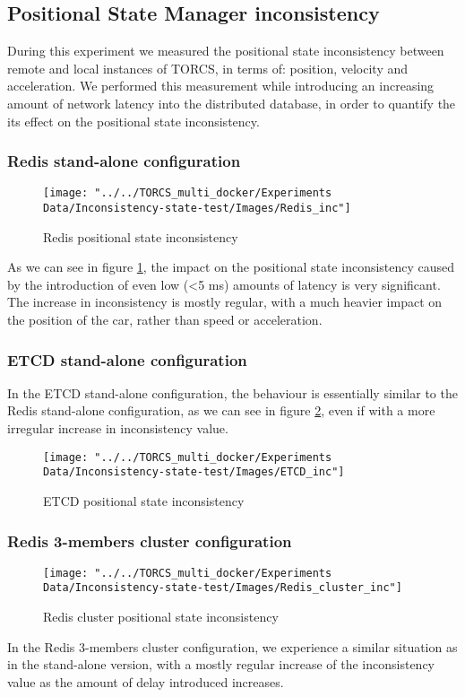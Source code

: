 \subsection{Positional State Manager inconsistency}
During this experiment we measured the positional state inconsistency between remote and local instances of TORCS, in terms of: position, velocity and acceleration. We performed this measurement while introducing an increasing amount of network latency into the distributed database, in order to quantify the its effect on the positional state inconsistency. 
\subsubsection{Redis stand-alone configuration}
\begin{figure}[h!]
	\centering
	\texttt{[image: "../../TORCS\_multi\_docker/Experiments Data/Inconsistency-state-test/Images/Redis\_inc"]}
	\caption[Redis positional state inconsistency]{Redis positional state inconsistency}
	\label{fig:redis-inconsistency}
\end{figure}
As we can see in figure \ref{fig:redis-inconsistency}, the impact on the positional state inconsistency caused by the introduction of even low (<5 ms) amounts of latency is very significant. The increase in inconsistency is mostly regular, with a much heavier impact on the position of the car, rather than speed or acceleration.

\subsubsection{ETCD stand-alone configuration}
In the ETCD stand-alone configuration, the behaviour is essentially similar to the Redis stand-alone configuration, as we can see in figure \ref{fig:etcd-inconsistency}, even if with a more irregular increase in inconsistency value.
\begin{figure}[h!]
	\centering
	\texttt{[image: "../../TORCS\_multi\_docker/Experiments Data/Inconsistency-state-test/Images/ETCD\_inc"]}
	\caption[ETCD positional state inconsistency]{ETCD positional state inconsistency}
	\label{fig:etcd-inconsistency}
\end{figure}

\subsubsection{Redis 3-members cluster configuration}
\begin{figure}[h!]
	\centering
	\texttt{[image: "../../TORCS\_multi\_docker/Experiments Data/Inconsistency-state-test/Images/Redis\_cluster\_inc"]}
	\caption[Redis cluster positional state inconsistency]{Redis cluster positional state inconsistency}
	\label{fig:redis-cluster-inconsistency}
\end{figure}
In the Redis 3-members cluster configuration, we experience a similar situation as in the stand-alone version, with a mostly regular increase of the inconsistency value as the amount of delay introduced increases.

